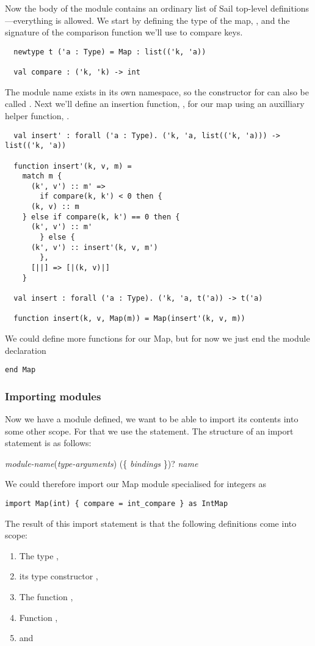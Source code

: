 Now the body of the module contains an ordinary list of Sail top-level
definitions---everything is allowed. We start by defining the type of
the map, , and the signature of the comparison function we'll
use to compare keys.
\begin{lstlisting}
  newtype t ('a : Type) = Map : list(('k, 'a))

  val compare : ('k, 'k) -> int
\end{lstlisting}
The module name exists in its own namespace, so the constructor for
 can also be called . Next we'll define an insertion
function, , for our map using an auxilliary helper
function, .
\begin{lstlisting}
  val insert' : forall ('a : Type). ('k, 'a, list(('k, 'a))) -> list(('k, 'a))

  function insert'(k, v, m) =
    match m {
      (k', v') :: m' =>
        if compare(k, k') < 0 then {
	  (k, v) :: m
	} else if compare(k, k') == 0 then {
	  (k', v') :: m'
        } else {
	  (k', v') :: insert'(k, v, m')
        },
      [||] => [|(k, v)|]
    }

  val insert : forall ('a : Type). ('k, 'a, t('a)) -> t('a)

  function insert(k, v, Map(m)) = Map(insert'(k, v, m))
\end{lstlisting}
We could define more functions for our Map, but for now we just end
the module declaration
\begin{lstlisting}
end Map
\end{lstlisting}

\subsubsection{Importing modules}

Now we have a module defined, we want to be able to import its
contents into some other scope. For that we use the 
statement. The structure of an import statement is as follows:
\begin{center}
   \textit{module-name}(\textit{type-arguments})
  (\{ \textit{bindings} \})?
   \textit{name}
\end{center}
We could therefore import our Map module specialised for integers as
\begin{lstlisting}
import Map(int) { compare = int_compare } as IntMap
\end{lstlisting}
The result of this import statement is that the following definitions come into scope:
\begin{enumerate}
\item
  The type ,
\item
  its type constructor ,
\item
  The function ,
\item
  Function ,
\item
  and 
\end{enumerate}

